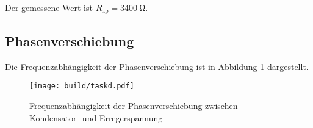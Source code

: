 Der gemessene Wert ist $R_{\text{ap}} = \SI{3400}{\ohm}$.

\subsection{Phasenverschiebung}

Die Frequenzabhängigkeit der Phasenverschiebung ist in Abbildung \ref{fig:phasenplot} dargestellt.

\begin{figure}
	\centering
	\texttt{[image: build/taskd.pdf]}
	\caption{Frequenzabhängigkeit der Phasenverschiebung zwischen Kondensator- und Erregerspannung}
	\label{fig:phasenplot}
\end{figure}
